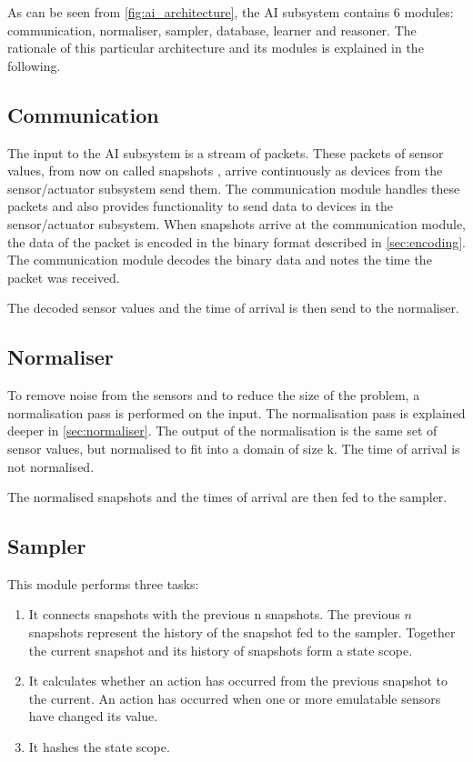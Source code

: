 As can be seen from \cref{fig:ai_architecture}, the AI subsystem contains 6 modules: communication, normaliser, sampler, database, learner and reasoner. The rationale of this particular architecture and its modules is explained in the following.

\subsection{Communication}
The input to the AI subsystem is a stream of packets. These packets of sensor values, from now on called snapshots , arrive continuously as devices from the sensor/actuator subsystem send them. The communication module handles these packets and also provides functionality to send data to devices in the sensor/actuator subsystem. When snapshots arrive at the communication module, the data of the packet is encoded in the binary format described in \cref{sec:encoding}. The communication module decodes the binary data and notes the time the packet was received.

The decoded sensor values and the time of arrival is then send to the normaliser. 

\subsection{Normaliser}
To remove noise from the sensors and to reduce the size of the problem, a normalisation pass is performed on the input. The normalisation pass is explained deeper in \cref{sec:normaliser}. The output of the normalisation is the same set of sensor values, but normalised to fit into a domain of size k. The time of arrival is not normalised.

The normalised snapshots and the times of arrival are then fed to the sampler.

\subsection{Sampler}
This module performs three tasks:

\begin{enumerate}
\item It connects snapshots with the previous n snapshots. The previous $n$ snapshots represent the history of the snapshot fed to the sampler. Together the current snapshot and its history of snapshots form a state scope.
\item It calculates whether an action has occurred from the previous snapshot to the current. An action has occurred when one or more emulatable sensors have changed its value.
\item It hashes the state scope.
\end{enumerate}

